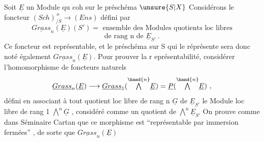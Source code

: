 Soit  $\underline{E}$  un Module qu coh  sur le préschéma $\unsure{S|X}$\hand{,} Considérons le
foncteur \qquad $(Sch)_{/S}^{\,o} \longrightarrow (Ens)$  défini par
\[ \underline{Grass}_n(\underline{E})(S') = \text{ ensemble des Modules quotients loc libres} \]
\[ \text{de rang  n  de } \underline{E}_{S'} \ . \]
Ce foncteur est représentable, et le préschéma sur S qui le réprésente
sera donc noté également $\underline{Grass}_n(\underline{E})$.  Pour prouver la r eprésentabilité,
considérer l'homomorphisme de foncteurs naturels
\[ \underline{Grass}_n(\underline{E}) \longrightarrow \underline{Grass}_1( \overset{\hand{n}}{\textstyle\bigwedge} \underline{E} ) = \underline{P} ( \overset{\hand{n}}{\textstyle\bigwedge} \underline{E}) \ , \]
défini en associant à  tout  quotient loc libre  de rang n  $\underline{G}$  de $\underline{E}_{S'}$
le Module  loc libre de rang 1 \quad $\overset{n}{\textstyle\bigwedge} \underline{G}$ , considéré comme un quotient
de  $\overset{n}{\textstyle\bigwedge} \underline{E}_{S'}$   On prouve comme dans  Séminaire Cartan que  ce morphisme
est  ``représentable par  immersion fermées'' , de sorte que $\underline{Grass}_n(\underline{E})$

